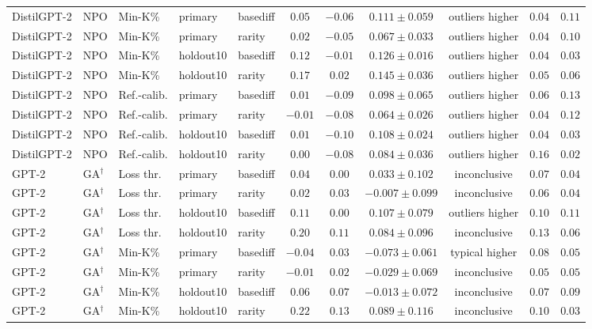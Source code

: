 \begin{table}[t]
\begin{tabular*}{\textwidth}{@{\extracolsep{\fill}}lllllcccccc@{}}
DistilGPT-2 & NPO & Min-K\% & primary & basediff & $0.05$ & $-0.06$ & $0.111 \pm 0.059$ & outliers higher & $0.04$ & $0.11$ \\
DistilGPT-2 & NPO & Min-K\% & primary & rarity & $0.02$ & $-0.05$ & $0.067 \pm 0.033$ & outliers higher & $0.04$ & $0.10$ \\
DistilGPT-2 & NPO & Min-K\% & holdout10 & basediff & $0.12$ & $-0.01$ & $0.126 \pm 0.016$ & outliers higher & $0.04$ & $0.03$ \\
DistilGPT-2 & NPO & Min-K\% & holdout10 & rarity & $0.17$ & $0.02$ & $0.145 \pm 0.036$ & outliers higher & $0.05$ & $0.06$ \\
DistilGPT-2 & NPO & Ref.-calib. & primary & basediff & $0.01$ & $-0.09$ & $0.098 \pm 0.065$ & outliers higher & $0.06$ & $0.13$ \\
DistilGPT-2 & NPO & Ref.-calib. & primary & rarity & $-0.01$ & $-0.08$ & $0.064 \pm 0.026$ & outliers higher & $0.04$ & $0.12$ \\
DistilGPT-2 & NPO & Ref.-calib. & holdout10 & basediff & $0.01$ & $-0.10$ & $0.108 \pm 0.024$ & outliers higher & $0.04$ & $0.03$ \\
DistilGPT-2 & NPO & Ref.-calib. & holdout10 & rarity & $0.00$ & $-0.08$ & $0.084 \pm 0.036$ & outliers higher & $0.16$ & $0.02$ \\
GPT-2 & GA$^{\dagger}$ & Loss thr. & primary & basediff & $0.04$ & $0.00$ & $0.033 \pm 0.102$ & inconclusive & $0.07$ & $0.04$ \\
GPT-2 & GA$^{\dagger}$ & Loss thr. & primary & rarity & $0.02$ & $0.03$ & $-0.007 \pm 0.099$ & inconclusive & $0.06$ & $0.04$ \\
GPT-2 & GA$^{\dagger}$ & Loss thr. & holdout10 & basediff & $0.11$ & $0.00$ & $0.107 \pm 0.079$ & outliers higher & $0.10$ & $0.11$ \\
GPT-2 & GA$^{\dagger}$ & Loss thr. & holdout10 & rarity & $0.20$ & $0.11$ & $0.084 \pm 0.096$ & inconclusive & $0.13$ & $0.06$ \\
GPT-2 & GA$^{\dagger}$ & Min-K\% & primary & basediff & $-0.04$ & $0.03$ & $-0.073 \pm 0.061$ & typical higher & $0.08$ & $0.05$ \\
GPT-2 & GA$^{\dagger}$ & Min-K\% & primary & rarity & $-0.01$ & $0.02$ & $-0.029 \pm 0.069$ & inconclusive & $0.05$ & $0.05$ \\
GPT-2 & GA$^{\dagger}$ & Min-K\% & holdout10 & basediff & $0.06$ & $0.07$ & $-0.013 \pm 0.072$ & inconclusive & $0.07$ & $0.09$ \\
GPT-2 & GA$^{\dagger}$ & Min-K\% & holdout10 & rarity & $0.22$ & $0.13$ & $0.089 \pm 0.116$ & inconclusive & $0.10$ & $0.03$ \\

\end{tabular*}
\end{table}
